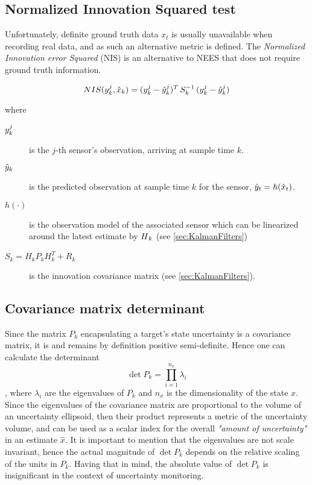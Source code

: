 \subsection{Normalized Innovation Squared test}
Unfortunately, definite ground truth data $x_t$ is usually unavailable when recording real data, and as such an alternative metric is defined. The \emph{Normalized Innovation error Squared} (NIS) is an alternative to NEES that does not require ground truth information.

\begin{equation}\label{eq:NIS}
NIS({y}^j_k,\hat{x}_k) = ({{y}}^j_k - {{\hat{{y}}}}^j_k)^T \, S_k^{-1} \, ({{y}}^j_k - {{\hat{{y}}}}^j_k)
\end{equation}

where

\begin{description}
	\item[$ {y}^j_k $] is the $j$-th sensor's observation, arriving at sample time $k$.
	\item[$ {\hat{{y}}}_k $] is the predicted observation at sample time $k$ for the  sensor, \ie $ {\hat{{y}}}_t =  h(\hat{x}_t)$.
	\item[$h(\cdot)$] is the observation model of the associated sensor which can be linearized around the latest estimate by $\begin{matrix}H\end{matrix}_k$ (see \cref{sec:KalmanFilters})
	\item[$S_k = H_k P_k H_k^T + R_k$] is the innovation covariance matrix (see \cref{sec:KalmanFilters}).
\end{description}


\subsection{Covariance matrix determinant}


Since the matrix $P_k$ encapsulating a target's state uncertainty is a covariance matrix, it is and remains by definition positive semi-definite. Hence one can calculate the determinant $$\det{P_k} = \prod_{i=1}^{n_x} \lambda_i$$ , where $\lambda_i$ are the eigenvalues of $P_k$ and $n_x$ is the dimensionality of the state $x$. Since the eigenvalues of the covariance matrix are proportional to the volume of an uncertainty ellipsoid, then their product represents a metric of the uncertainty volume, and can be used as a scalar index for the overall \textit{"amount of uncertainty"} in an estimate $\hat{x}$. It is important to mention that the eigenvalues are not scale invariant, hence the actual magnitude of $\det{P_k}$ depends on the relative scaling of the units in $P_k$. Having that in mind, the absolute value of $\det{P_k}$ is insignificant in the context of uncertainty monitoring. 


